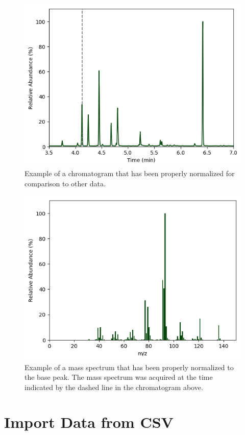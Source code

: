 \documentclass[]{tufte-book}
\begin{document}
\begin{figure}
\centering
\includegraphics{./images/chromatogram.png}
\caption{Example of a chromatogram that has been properly normalized for comparison to other data.}
\end{figure}

\begin{figure}
\centering
\includegraphics{./images/mass-spectrum.png}
\caption{Example of a mass spectrum that has been properly normalized to the base peak. The mass spectrum was acquired at the time indicated by the dashed line in the chromatogram above.}
\end{figure}

\hypertarget{import-data-from-csv}{%
\section*{Import Data from CSV}\label{import-data-from-csv}}
\end{document}
